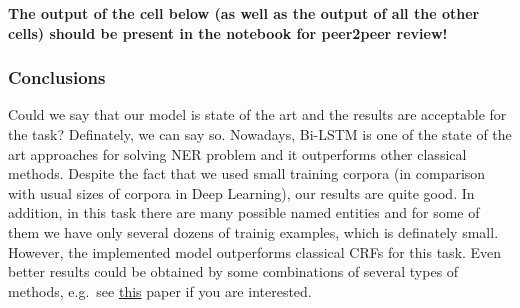 \documentclass[11pt]{article}
\begin{document}
\textbf{The output of the cell below (as well as the output of all the
other cells) should be present in the notebook for peer2peer review!}

    \hypertarget{conclusions}{%
\subsubsection{Conclusions}\label{conclusions}}

Could we say that our model is state of the art and the results are
acceptable for the task? Definately, we can say so. Nowadays, Bi-LSTM is
one of the state of the art approaches for solving NER problem and it
outperforms other classical methods. Despite the fact that we used small
training corpora (in comparison with usual sizes of corpora in Deep
Learning), our results are quite good. In addition, in this task there
are many possible named entities and for some of them we have only
several dozens of trainig examples, which is definately small. However,
the implemented model outperforms classical CRFs for this task. Even
better results could be obtained by some combinations of several types
of methods, e.g.~see \href{https://arxiv.org/abs/1603.01354}{this} paper
if you are interested.


    
    
    
\end{document}
